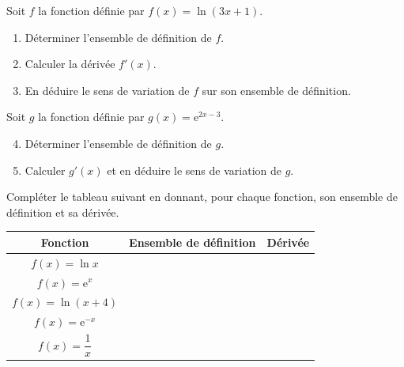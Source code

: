 \documentclass[11pt]{article}
\begin{document}
\begin{exercice}
Soit $f$ la fonction définie par $f(x) = \ln(3x+1)$.
\begin{enumerate}
\item Déterminer l'ensemble de définition de $f$.
\item Calculer la dérivée $f'(x)$.
\item En déduire le sens de variation de $f$ sur son ensemble de définition.
\end{enumerate}
Soit $g$ la fonction définie par $g(x) = \mathrm{e}^{2x-3}$.
\begin{enumerate}
\setcounter{enumi}{3}
\item Déterminer l'ensemble de définition de $g$.
\item Calculer $g'(x)$ et en déduire le sens de variation de $g$.
\end{enumerate}
\end{exercice}

\begin{exercice}
Compléter le tableau suivant en donnant, pour chaque fonction, son ensemble de définition et sa dérivée.

\begin{center}
\begin{tabular}{|c|c|c|}
\hline
\textbf{Fonction} & \textbf{Ensemble de définition} & \textbf{Dérivée} \\
\hline
$f(x) = \ln x$ & & \\
\hline
$f(x) = \mathrm{e}^x$ & & \\
\hline
$f(x) = \ln(x+4)$ & & \\
\hline
$f(x) = \mathrm{e}^{-x}$ & & \\
\hline
$f(x) = \dfrac{1}{x}$ & & \\
\hline
\end{tabular}
\end{center}
\end{exercice}
\end{document}
